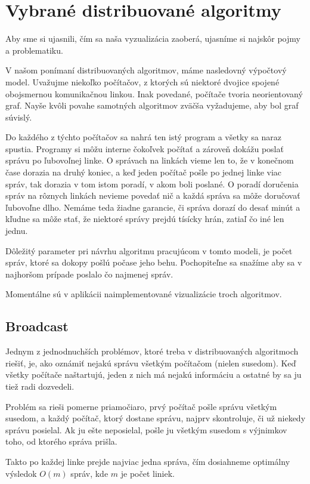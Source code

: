 \section{Vybrané distribuované algoritmy}

Aby sme si ujasnili, čím sa naša vyzualizácia zaoberá, ujasníme si najskôr pojmy a problematiku.

V našom ponímaní distribuovaných algoritmov, máme nasledovný výpočtový model.
Uvažujme niekoľko počítačov, z ktorých sú niektoré dvojice spojené obojsmernou komunikačnou linkou.
Inak povedané, počítače tvoria neorientovaný graf. Nayše kvôli povahe samotných algoritmov zväčša vyžadujeme,
aby bol graf súvislý.

Do každého z týchto počítačov sa nahrá ten istý program a všetky sa naraz spustia. Programy si môžu
interne čokoľvek počítať a zároveň dokážu poslať správu po ľubovoľnej linke. O správach na linkách
vieme len to, že v konečnom čase dorazia na druhý koniec, a keď jeden počítač pošle po jednej linke
viac správ, tak dorazia v tom istom poradí, v akom boli poslané. O poradí doručenia správ na rôznych
linkách nevieme povedať nič a každá správa sa môže doručovať ľubovoľne dlho. Nemáme teda žiadne garancie, či
správa dorazí do desať minút a kľudne sa môže stať, že niektoré správy prejdú tísícky hrán, zatiaľ čo
iné len jednu.

Dôležitý parameter pri návrhu algoritmu pracujúcom v tomto modeli, je počet správ, ktoré sa dokopy
pošlú počase jeho behu. Pochopiteľne sa snažíme aby sa v najhoršom prípade poslalo čo najmenej
správ.

Momentálne sú v aplikácii naimplementované vizualizácie troch algoritmov.

\subsection{Broadcast}

Jednym z jednodnuchších problémov, ktoré treba v distribuovaných algoritmoch riešiť, je, ako 
oznámiť nejakú správu všetkým počítačom (nielen susedom). Keď všetky počítače naštartujú, 
jeden z nich má nejakú informáciu a ostatné by sa ju tiež radi dozvedeli.

Problém sa rieši pomerne priamočiaro, prvý počítač pošle správu všetkým susedom, a každý
počítač, ktorý dostane správu, najprv skontroluje, či už niekedy správu posielal. 
Ak ju ešte neposielal, pošle ju všetkým susedom s výjnimkov toho, od ktorého správa prišla.

Takto po každej linke prejde najviac jedna správa, čím dosiahneme optimálny výsledok $O(m)$ správ,
kde $m$ je počet liniek.

